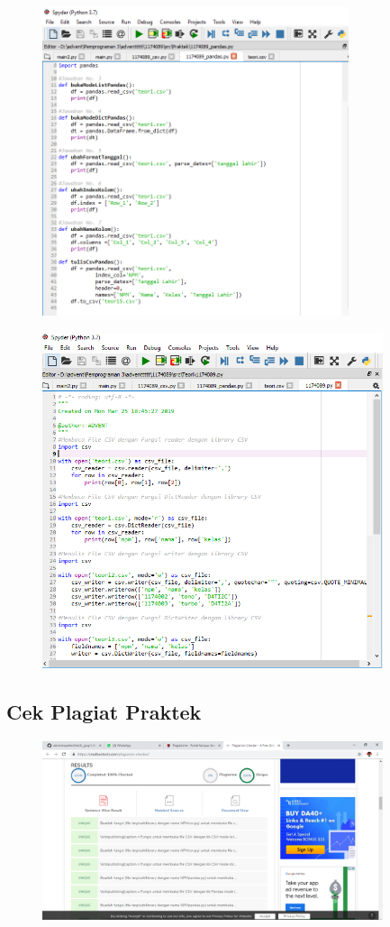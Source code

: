 \begin{figure}[H]
	\includegraphics[width=9cm]{figures/4/1174089/Praktek/k4.png}
	\centering
\end{figure}
\begin{figure}[H]
	\includegraphics[width=10cm]{figures/4/1174089/Praktek/k5.png}
	\centering
\end{figure}

\subsection{Cek Plagiat Praktek}
\begin{figure}[H]
	\includegraphics[width=10cm]{figures/4/1174089/Praktek/plagiatketerampilan.png}
	\centering
\end{figure}

